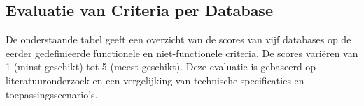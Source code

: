     \subsection{Evaluatie van Criteria per Database}
    De onderstaande tabel geeft een overzicht van de scores van vijf databases op de eerder gedefinieerde functionele en niet-functionele criteria. De scores variëren van 1 (minst geschikt) tot 5 (meest geschikt). Deze evaluatie is gebaseerd op literatuuronderzoek en een vergelijking van technische specificaties en toepassingsscenario’s.

    \begin{table}[H]
        \centering
        \caption{Scores van databases op niet-functionele selectiecriteria. \autocite{Mahmud2020, PostgreSQLDocumentation, CassandraDocumentation, RedisDocumentation, TimescaleDBDocumentation, MongoDBDocumentation}}
        \label{tab:database-scoring}
\end{table}
